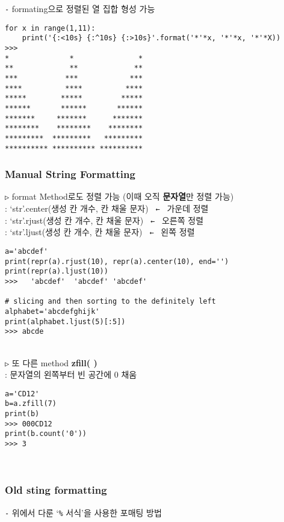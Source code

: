 \documentclass[11pt,a4paper]{article}
\begin{document}
\texttt{-} formating으로 정렬된 열 집합 형성 가능
\begin{lstlisting}[label={list:first}]
for x in range(1,11):
    print('{:<10s} {:^10s} {:>10s}'.format('*'*x, '*'*x, '*'*X))
>>>
*              *               *
**             **             **
***           ***            ***
****          ****          ****
*****        *****         *****
******       ******       ******
*******     *******      *******
********    ********    ********
*********  *********   *********
********** ********** **********
\end{lstlisting}

\subsubsection{\Large\textbf{Manual String Formatting}}
\begin{spacing}{1.5}
\texttt{▷} format Method로도 정렬 가능 (이때 오직 \textbf{문자열}만 정렬 가능)\\
: `str'.center(생성 칸 개수, 칸 채울 문자) \texttt{ ← } 가운데 정렬\\
: `str'.rjust(생성 칸 개수, 칸 채울 문자) \texttt{ ← } 오른쪽 정렬\\
: `str'.ljust(생성 칸 개수, 칸 채울 문자) \texttt{ ← } 왼쪽 정렬
\begin{lstlisting}[label={list:first}]
a='abcdef'
print(repr(a).rjust(10), repr(a).center(10), end='')
print(repr(a).ljust(10))
>>>   'abcdef'  'abcdef' 'abcdef'

# slicing and then sorting to the definitely left
alphabet='abcdefghijk'
print(alphabet.ljust(5)[:5])
>>> abcde
\end{lstlisting}\\
\texttt{▷} 또 다른 method \textbf{zfill( )}\\
: 문자열의 왼쪽부터 빈 공간에 0 채움
\begin{lstlisting}[label={list:first}]
a='CD12'
b=a.zfill(7)
print(b)
>>> 000CD12
print(b.count('0'))
>>> 3
\end{lstlisting}
\end{spacing}\\

\subsubsection{\Large\textbf{Old sting formatting}}
\texttt{-} 위에서 다룬 `\verb|%| 서식'을 사용한 포매팅 방법\\
\end{document}
